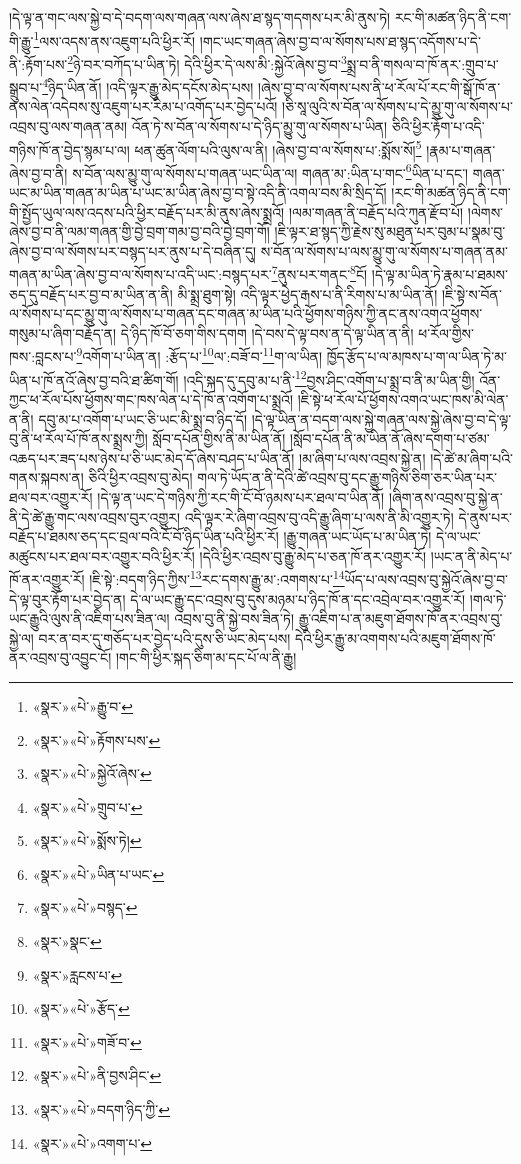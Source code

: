 །དེ་ལྟ་ན་གང་ལས་སྐྱེ་བ་དེ་བདག་ལས་གཞན་ལས་ཞེས་ཐ་སྙད་གདགས་པར་མི་ནུས་ཏེ། རང་གི་མཚན་ཉིད་ནི་ངག་གི་རྒྱུ་\footnote{«སྣར་»«པེ་»རྒྱུ་བ་}ལས་འདས་ནས་འཇུག་པའི་ཕྱིར་རོ། །གང་ཡང་གཞན་ཞེས་བྱ་བ་ལ་སོགས་པས་ཐ་སྙད་འདོགས་པ་དེ་ནི་:རྟོག་པས་\footnote{«སྣར་»«པེ་»རྟོགས་པས་}ཉེ་བར་བཀོད་པ་ཡིན་ཏེ། དེའི་ཕྱིར་དེ་ལས་མི་:སྐྱེའོ་ཞེས་བྱ་བ་\footnote{«སྣར་»«པེ་»སྐྱེའོ་ཞེས་}སྨྲ་བ་ནི་གསལ་བ་ཁོ་ནར་:གྲུབ་པ་སྒྲུབ་པ་\footnote{«སྣར་»«པེ་»གྲུབ་པ་}ཉིད་ཡིན་ནོ། །འདི་ལྟར་རྒྱུ་མེད་དངོས་མེད་པས། །ཞེས་བྱ་བ་ལ་སོགས་པས་ནི་ཕ་རོལ་པོ་རང་གི་སྒོ་ཁོ་ན་ནས་ལེན་འདེབས་སུ་འཇུག་པར་རིམ་པ་འགོད་པར་བྱེད་པའོ། །ཅི་སཱ་ལུའི་ས་བོན་ལ་སོགས་པ་དེ་མྱུ་གུ་ལ་སོགས་པ་འབྲས་བུ་ལས་གཞན་ནམ། འོན་ཏེ་ས་བོན་ལ་སོགས་པ་དེ་ཉིད་མྱུ་གུ་ལ་སོགས་པ་ཡིན། ཅིའི་ཕྱིར་རྟོག་པ་འདི་གཉིས་ཁོ་ན་བྱེད་སྙམ་པ་ལ། ཕན་ཚུན་ལོག་པའི་ལུས་ལ་ནི། །ཞེས་བྱ་བ་ལ་སོགས་པ་:སྨོས་སོ།\footnote{«སྣར་»«པེ་»སྨོས་ཏེ།} །རྣམ་པ་གཞན་ཞེས་བྱ་བ་ནི། ས་བོན་ལས་མྱུ་གུ་ལ་སོགས་པ་གཞན་ཡང་ཡིན་ལ། གཞན་མ་:ཡིན་པ་གང་\footnote{«སྣར་»«པེ་»ཡིན་པ་ཡང་}ཡིན་པ་དང་། གཞན་ཡང་མ་ཡིན་གཞན་མ་ཡིན་པ་ཡང་མ་ཡིན་ཞེས་བྱ་བ་སྟེ་འདི་ནི་འགལ་བས་མི་སྲིད་དོ། །རང་གི་མཚན་ཉིད་ནི་ངག་གི་སྤྱོད་ཡུལ་ལས་འདས་པའི་ཕྱིར་བརྗོད་པར་མི་ནུས་ཞེས་སྨྲའོ། །ལམ་གཞན་ནི་བརྗོད་པའི་ཀུན་རྫོབ་པོ། །ལེགས་ཞེས་བྱ་བ་ནི་ལམ་གཞན་གྱི་བྱེ་བྲག་གམ་བྱ་བའི་བྱེ་བྲག་གོ། །ཇི་ལྟར་ཐ་སྙད་ཀྱི་རྗེས་སུ་མཐུན་པར་བུམ་པ་སྣམ་བུ་ཞེས་བྱ་བ་ལ་སོགས་པར་བསྙད་པར་ནུས་པ་དེ་བཞིན་དུ། ས་བོན་ལ་སོགས་པ་ལས་མྱུ་གུ་ལ་སོགས་པ་གཞན་ནམ་གཞན་མ་ཡིན་ཞེས་བྱ་བ་ལ་སོགས་པ་འདི་ཡང་:བསྙད་པར་\footnote{«སྣར་»«པེ་»བསྙད་}ནུས་པར་གནང་\footnote{«སྣར་»སྣང་}ངོ། །དེ་ལྟ་མ་ཡིན་ཏེ་རྣམ་པ་ཐམས་ཅད་དུ་བརྗོད་པར་བྱ་བ་མ་ཡིན་ན་ནི། མི་སྨྲ་ཐུག་སྟེ། འདི་ལྟར་ཕྱེད་རྒས་པ་ནི་རིགས་པ་མ་ཡིན་ནོ། །ཇི་སྟེ་ས་བོན་ལ་སོགས་པ་དང་མྱུ་གུ་ལ་སོགས་པ་གཞན་དང་གཞན་མ་ཡིན་པའི་ཕྱོགས་གཉིས་ཀྱི་ནང་ནས་འགའ་ཕྱོགས་གསུམ་པ་ཞིག་བརྗོད་ན། དེ་ཉིད་ཁོ་བོ་ཅག་གིས་དགག །དེ་བས་དེ་ལྟ་བས་ན་དེ་ལྟ་ཡིན་ན་ནི། ཕ་རོལ་གྱིས་ཁས་:བླངས་པ་\footnote{«སྣར་»རླངས་པ་}འགོག་པ་ཡིན་ན། :རྩོད་པ་\footnote{«སྣར་»«པེ་»རྩོད་}ལ་:བཟོ་བ་\footnote{«སྣར་»«པེ་»གཟོ་བ་}ག་ལ་ཡིན། ཁྱོད་རྩོད་པ་ལ་མཁས་པ་ག་ལ་ཡིན་ཏེ་མ་ཡིན་པ་ཁོ་ནའོ་ཞེས་བྱ་བའི་ཐ་ཚིག་གོ། །འདི་སྐད་དུ་དབུ་མ་པ་ནི་\footnote{«སྣར་»«པེ་»ནི་བྱས་ཤིང་}བྱས་ཤིང་འགོག་པ་སྨྲ་བ་ནི་མ་ཡིན་གྱི། འོན་ཀྱང་ཕ་རོལ་པོས་ཕྱོགས་གང་ཁས་ལེན་པ་དེ་ཁོ་ན་འགོག་པ་སྨྲའོ། །ཇི་སྟེ་ཕ་རོལ་པོ་ཕྱོགས་འགའ་ཡང་ཁས་མི་ལེན་ན་ནི། དབུ་མ་པ་འགོག་པ་ཡང་ཅི་ཡང་མི་སྨྲ་བ་ཉིད་དོ། །དེ་ལྟ་ཡིན་ན་བདག་ལས་སྐྱེ་གཞན་ལས་སྐྱེ་ཞེས་བྱ་བ་དེ་ལྟ་བུ་ནི་ཕ་རོལ་པོ་ཁོ་ནས་སྨྲས་ཀྱི། སློབ་དཔོན་གྱིས་ནི་མ་ཡིན་ནོ། །སློབ་དཔོན་ནི་མ་ཡིན་ནོ་ཞེས་དགག་པ་ཙམ་འཆད་པར་ཟད་པས་ཉེས་པ་ཅི་ཡང་མེད་དོ་ཞེས་བཤད་པ་ཡིན་ནོ། །མ་ཞིག་པ་ལས་འབྲས་སྐྱེ་ན། །དེ་ཚེ་མ་ཞིག་པའི་གནས་སྐབས་ན། ཅིའི་ཕྱིར་འབྲས་བུ་མེད། གལ་ཏེ་ཡོད་ན་ནི་དེའི་ཚེ་འབྲས་བུ་དང་རྒྱུ་གཉིས་ཅིག་ཅར་ཡིན་པར་ཐལ་བར་འགྱུར་རོ། །དེ་ལྟ་ན་ཡང་དེ་གཉིས་ཀྱི་རང་གི་ངོ་བོ་ཉམས་པར་ཐལ་བ་ཡིན་ནོ། །ཞིག་ནས་འབྲས་བུ་སྐྱེ་ན་ནི་དེ་ཚེ་རྒྱུ་གང་ལས་འབྲས་བུར་འགྱུར། འདི་ལྟར་རེ་ཞིག་འབྲས་བུ་འདི་རྒྱུ་ཞིག་པ་ལས་ནི་མི་འགྱུར་ཏེ། དེ་ནུས་པར་བརྗོད་པ་ཐམས་ཅད་དང་བྲལ་བའི་ངོ་བོ་ཉིད་ཡིན་པའི་ཕྱིར་རོ། །རྒྱུ་གཞན་ཡང་ཡོད་པ་མ་ཡིན་ཏེ། དེ་ལ་ཡང་མཚུངས་པར་ཐལ་བར་འགྱུར་བའི་ཕྱིར་རོ། །དེའི་ཕྱིར་འབྲས་བུ་རྒྱུ་མེད་པ་ཅན་ཁོ་ནར་འགྱུར་རོ། །ཡང་ན་ནི་མེད་པ་ཁོ་ནར་འགྱུར་རོ། །ཇི་སྟེ་:བདག་ཉིད་ཀྱིས་\footnote{«སྣར་»«པེ་»བདག་ཉིད་ཀྱི་}རང་དགས་རྒྱུ་མ་:འགགས་པ་\footnote{«སྣར་»«པེ་»འགག་པ་}ཡོད་པ་ལས་འབྲས་བུ་སྐྱེའོ་ཞེས་བྱ་བ་དེ་ལྟ་བུར་རྟོག་པར་བྱེད་ན། དེ་ལ་ཡང་རྒྱུ་དང་འབྲས་བུ་དུས་མཉམ་པ་ཉིད་ཁོ་ན་དང་འབྲེལ་བར་འགྱུར་རོ། །གལ་ཏེ་ཡང་རྒྱུའི་ལུས་ནི་འཇིག་པས་ཟིན་ལ། འབྲས་བུ་ནི་སྐྱེ་བས་ཟིན་ཏེ། རྒྱུ་འཇིག་པ་ན་མཇུག་ཐོགས་ཁོ་ནར་འབྲས་བུ་སྐྱེ་ལ། བར་ན་བར་དུ་གཅོད་པར་བྱེད་པའི་དུས་ཅི་ཡང་མེད་པས། དེའི་ཕྱིར་རྒྱུ་མ་འགགས་པའི་མཇུག་ཐོགས་ཁོ་ནར་འབྲས་བུ་འབྱུང་ངོ། །གང་གི་ཕྱིར་སྐད་ཅིག་མ་དང་པོ་ལ་ནི་རྒྱུ། 